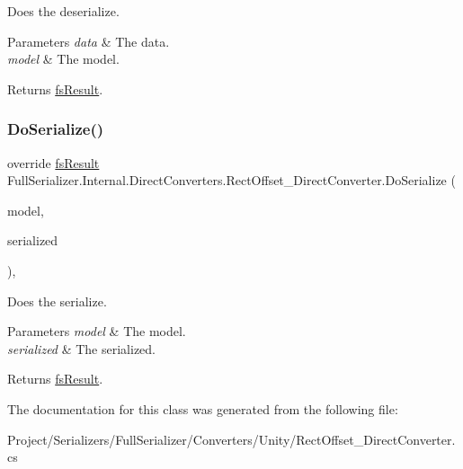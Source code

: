 Does the deserialize. 


\begin{DoxyParams}{Parameters}
{\em data} & The data.\\
\hline
{\em model} & The model.\\
\hline
\end{DoxyParams}
\begin{DoxyReturn}{Returns}
\hyperlink{struct_full_serializer_1_1fs_result}{fs\+Result}.
\end{DoxyReturn}
\mbox{\label{class_full_serializer_1_1_internal_1_1_direct_converters_1_1_rect_offset___direct_converter_a8959a2c6c51c1d84abd288541f98145b}} 
\subsubsection{\texorpdfstring{Do\+Serialize()}{DoSerialize()}}
{\footnotesize\ttfamily override \hyperlink{struct_full_serializer_1_1fs_result}{fs\+Result} Full\+Serializer.\+Internal.\+Direct\+Converters.\+Rect\+Offset\+\_\+\+Direct\+Converter.\+Do\+Serialize (\begin{DoxyParamCaption}\item[{Rect\+Offset}]{model,  }\item[{Dictionary$<$ string, \hyperlink{class_full_serializer_1_1fs_data}{fs\+Data} $>$}]{serialized }\end{DoxyParamCaption})\hspace{0.3cm}{\ttfamily [inline]}, {\ttfamily [protected]}}



Does the serialize. 


\begin{DoxyParams}{Parameters}
{\em model} & The model.\\
\hline
{\em serialized} & The serialized.\\
\hline
\end{DoxyParams}
\begin{DoxyReturn}{Returns}
\hyperlink{struct_full_serializer_1_1fs_result}{fs\+Result}.
\end{DoxyReturn}


The documentation for this class was generated from the following file\+:\begin{DoxyCompactItemize}
\item 
Project/\+Serializers/\+Full\+Serializer/\+Converters/\+Unity/Rect\+Offset\+\_\+\+Direct\+Converter.\+cs\end{DoxyCompactItemize}
